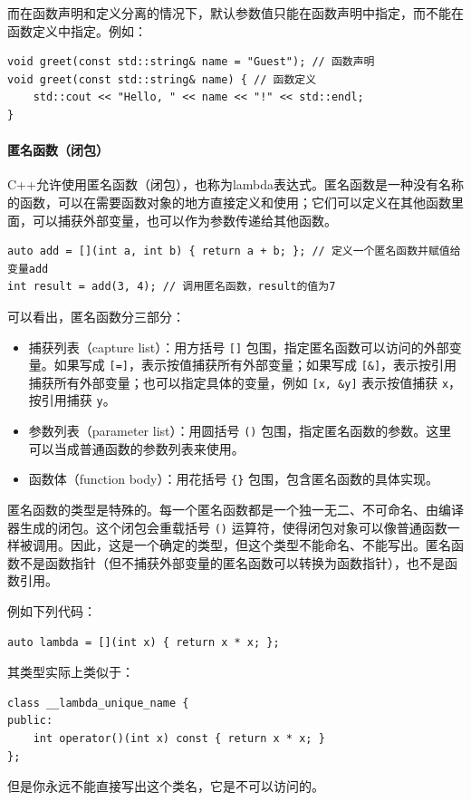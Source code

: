 而在函数声明和定义分离的情况下，默认参数值只能在函数声明中指定，而不能在函数定义中指定。例如：
\begin{verbatim}
void greet(const std::string& name = "Guest"); // 函数声明
void greet(const std::string& name) { // 函数定义
    std::cout << "Hello, " << name << "!" << std::endl;
}
\end{verbatim}

\paragraph{匿名函数（闭包）} 

C++允许使用匿名函数（闭包），也称为lambda表达式。匿名函数是一种没有名称的函数，可以在需要函数对象的地方直接定义和使用；它们可以定义在其他函数里面，可以捕获外部变量，也可以作为参数传递给其他函数。

\begin{verbatim}
auto add = [](int a, int b) { return a + b; }; // 定义一个匿名函数并赋值给变量add
int result = add(3, 4); // 调用匿名函数，result的值为7
\end{verbatim}
可以看出，匿名函数分三部分：
\begin{itemize}
    \item 捕获列表（capture list）：用方括号 \verb|[]| 包围，指定匿名函数可以访问的外部变量。如果写成 \verb|[=]|，表示按值捕获所有外部变量；如果写成 \verb|[&]|，表示按引用捕获所有外部变量；也可以指定具体的变量，例如 \verb|[x, &y]| 表示按值捕获 \verb|x|，按引用捕获 \verb|y|。
    \item 参数列表（parameter list）：用圆括号 \verb|()| 包围，指定匿名函数的参数。这里可以当成普通函数的参数列表来使用。
    \item 函数体（function body）：用花括号 \verb|{}| 包围，包含匿名函数的具体实现。
\end{itemize}

匿名函数的类型是特殊的。每一个匿名函数都是一个独一无二、不可命名、由编译器生成的闭包。这个闭包会重载括号 \verb|()| 运算符，使得闭包对象可以像普通函数一样被调用。因此，这是一个确定的类型，但这个类型不能命名、不能写出。匿名函数不是函数指针（但不捕获外部变量的匿名函数可以转换为函数指针），也不是函数引用。

例如下列代码：
\begin{verbatim}
auto lambda = [](int x) { return x * x; };
\end{verbatim}
其类型实际上类似于：
\begin{verbatim}
class __lambda_unique_name {
public:
    int operator()(int x) const { return x * x; }
};
\end{verbatim}
但是你永远不能直接写出这个类名，它是不可以访问的。

